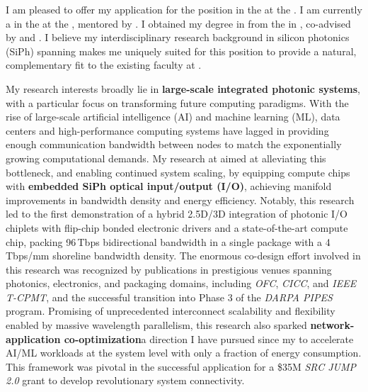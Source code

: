I am pleased to offer my application for the \appPosition{} position \appJobID{} in the \appDept{} at the \appSchool{}. I am currently a \myTitle{} in the \myDept{} at the \mySchoolShort{}, mentored by \mySuper{}. I obtained my \myDegree{} degree in \myMajor{} from the \myPhDSchool{} in \myPhDYear{}, co-advised by \myAdvisor{} and \myCoAdvisor{}. I believe my interdisciplinary research background in silicon photonics (SiPh) spanning \appArea{} makes me uniquely suited for this position to provide a natural, complementary fit to the existing faculty at \appSchoolDeptShort{}.

My research interests broadly lie in \textbf{large-scale integrated photonic systems}, with a particular focus on transforming future computing paradigms. With the rise of large-scale artificial intelligence (AI) and machine learning (ML), data centers and high-performance computing systems have lagged in providing enough communication bandwidth between nodes to match the exponentially growing computational demands. My research at \mySchoolShort{} aimed at alleviating this bottleneck, and enabling continued system scaling, by equipping compute chips with \textbf{embedded SiPh optical input/output (I/O)}, achieving manifold improvements in bandwidth density and energy efficiency. Notably, this research led to the first demonstration of a hybrid 2.5D/3D integration of photonic I/O chiplets with flip-chip bonded electronic drivers and a state-of-the-art compute chip, packing 96\,Tbps bidirectional bandwidth in a single package with a 4\,Tbps/mm shoreline bandwidth density. The enormous co-design effort involved in this research was recognized by publications in prestigious venues spanning photonics, electronics, and packaging domains, including \emph{OFC}, \emph{CICC}, and \emph{IEEE T-CPMT}, and the successful transition into Phase 3 of the \emph{DARPA PIPES} program. Promising of unprecedented interconnect scalability and flexibility enabled by massive wavelength parallelism, this research also sparked \textbf{network-application co-optimization}\textemdash{}a direction I have pursued since my \myDegree{}\textemdash{}to accelerate AI/ML workloads at the system level with only a fraction of energy consumption. This framework was pivotal in the successful application for a \$35M \emph{SRC JUMP 2.0} grant to develop revolutionary system connectivity.

